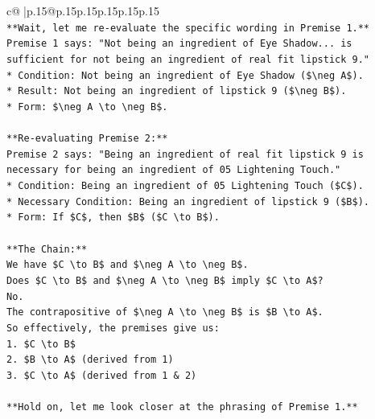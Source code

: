 \documentclass{article}
\begin{document}
{\begin{supertabular}{c@{$\;$}|p{.15\linewidth}@{}p{.15\linewidth}p{.15\linewidth}p{.15\linewidth}p{.15\linewidth}p{.15\linewidth}}
{{{\\ 
\texttt{**Wait, let me re{-}evaluate the specific wording in Premise 1.**} \\
\texttt{Premise 1 says: "Not being an ingredient of Eye Shadow... is sufficient for not being an ingredient of real fit lipstick 9."} \\
\texttt{*   Condition: Not being an ingredient of Eye Shadow (\$\textbackslash{}neg A\$).} \\
\texttt{*   Result: Not being an ingredient of lipstick 9 (\$\textbackslash{}neg B\$).} \\
\texttt{*   Form: \$\textbackslash{}neg A \textbackslash{}to \textbackslash{}neg B\$.} \\
\\ 
\texttt{**Re{-}evaluating Premise 2:**} \\
\texttt{Premise 2 says: "Being an ingredient of real fit lipstick 9 is necessary for being an ingredient of 05 Lightening Touch."} \\
\texttt{*   Condition: Being an ingredient of 05 Lightening Touch (\$C\$).} \\
\texttt{*   Necessary Condition: Being an ingredient of lipstick 9 (\$B\$).} \\
\texttt{*   Form: If \$C\$, then \$B\$ (\$C \textbackslash{}to B\$).} \\
\\ 
\texttt{**The Chain:**} \\
\texttt{We have \$C \textbackslash{}to B\$ and \$\textbackslash{}neg A \textbackslash{}to \textbackslash{}neg B\$.} \\
\texttt{Does \$C \textbackslash{}to B\$ and \$\textbackslash{}neg A \textbackslash{}to \textbackslash{}neg B\$ imply \$C \textbackslash{}to A\$?} \\
\texttt{No.} \\
\texttt{The contrapositive of \$\textbackslash{}neg A \textbackslash{}to \textbackslash{}neg B\$ is \$B \textbackslash{}to A\$.} \\
\texttt{So effectively, the premises give us:} \\
\texttt{1. \$C \textbackslash{}to B\$} \\
\texttt{2. \$B \textbackslash{}to A\$ (derived from 1)} \\
\texttt{3. \$C \textbackslash{}to A\$ (derived from 1 \& 2)} \\
\\ 
\texttt{**Hold on, let me look closer at the phrasing of Premise 1.**} \\
}}}
\end{supertabular}}
\end{document}
